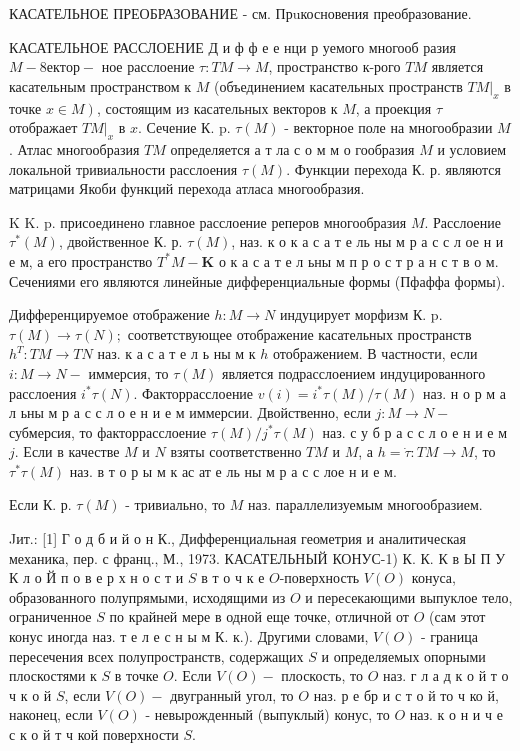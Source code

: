 \documentclass[10pt]{article}
\begin{document}
КАСАТЕЛЬНОЕ ПРЕОБРАЗОВАНИЕ - см. Прuкосновения преобразование.



КАСАТЕЛЬНОЕ РАССЛОЕНИЕ Д и ф ф е е нци р уемого многооб разия $M-8 е к т о р-$ ное расслоение $\tau: T M \rightarrow M$, пространство к-рого $T M$ является касательным пространством к $M$ (объединением касательных пространств $\left.T M\right|_{x}$ в точке $\left.x \in M\right)$, состоящим из касательных векторов к $M$, а проекция $\tau$ отображает $\left.T M\right|_{x}$ в $x$. Сечение $К$. p. $\tau(M)$ - векторное поле на многообразии $M$. Атлас многообразия $T M$ определяется а т ла с о м м о гообразия $M$ и условием локальной тривиальности расслоения $\tau(M)$. Функции перехода К. р. являются матрицами Якоби функций перехода атласа многообразия.



K K. p. присоединено главное расслоение реперов многообразия $M$. Расслоение $\tau^{*}(M)$, двойственное К. р. $\tau(M)$, наз. к о к а с а т е ль ны м р а с с л ое н и е м, а его пространство $T^{*} M-\mathbf{K}$ о к а с а т е л ьны м п р о с т р а н с т в о м. Сечениями его являются линейные дифференциальные формы (Пфаффа формы).



Дифференцируемое отображение $h: M \rightarrow N$ индуцирует морфизм К. p. $\tau(M) \rightarrow \tau(N) ;$ соответствующее отображение касательных пространств $h^{T}: T M \rightarrow T N$ наз. к а с а т е л ь ны м к $h$ отображением. В частности, если $i: M \rightarrow N-$ иммерсия, то $\tau(M)$ является подрасслоением индуцированного расслоения $i^{*} \tau(N)$. Факторрасслоение $v(i)=i^{*} \tau(M) / \tau(M)$ наз. н о р м а л ьны м р а с с л о е н и е м иммерсии. Двойственно, если $j: M \rightarrow N-$ субмерсия, то факторрасслоение $\tau(M) / j^{*} \tau(M)$ наз. с у б р а с с л о е н и е м $j$. Если в качестве $M$ и $N$ взяты соответственно $T M$ и $M$, а $h=\dot{\tau}: T M \rightarrow M$, то $\tau^{*} \tau(M)$ наз. в т о р ы м к ас ат е ль ны м р а с с лое н и е м.



Если К. р. $\tau(M)$ - тривиально, то $M$ наз. параллелизуемым многообразием.



Jит.: [1] Г о д б и й о н К., Дифференциальная геометрия и аналитическая механика, пер. с франц., М., 1973. КАСАТЕЛЬНЫЙ КОНУС-1) К. К. К в Ы П У К л о Й п о в е р х н о с т и $S$ в т о ч к е $O$-поверхность $V(O)$ конуса, образованного полупрямыми, исходящими из $O$ и пересекающими выпуклое тело, ограниченное $S$ по крайней мере в одной еще точке, отличной от $O$ (сам этот конус иногда наз. т е л е с н ы м К. к.). Другими словами, $V(O)$ - граница пересечения всех полупространств, содержащих $S$ и определяемых опорными плоскостями к $S$ в точке $O$. Если $V(O)-$ плоскость, то $O$ наз. г л а д к о й т о ч к о й $S$, если $V(O)-$ двугранный угол, то $O$ наз. р е бр и с т о й то ч ко й, наконец, если $V(O)$ - невырожденный (выпуклый) конус, то $O$ наз. к о н и ч е с к о й т ч кой поверхности $S$.
\end{document}
